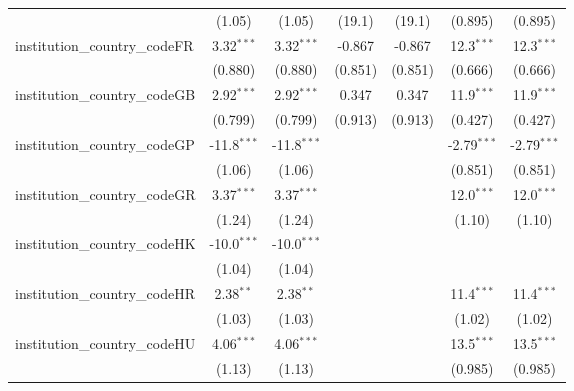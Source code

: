 \begin{tabular}{lcccccc}
                                         & (1.05)         & (1.05)         & (19.1)        & (19.1)        & (0.895)       & (0.895)\\   
   institution\_country\_codeFR          & 3.32$^{***}$   & 3.32$^{***}$   & -0.867        & -0.867        & 12.3$^{***}$  & 12.3$^{***}$\\   
                                         & (0.880)        & (0.880)        & (0.851)       & (0.851)       & (0.666)       & (0.666)\\   
   institution\_country\_codeGB          & 2.92$^{***}$   & 2.92$^{***}$   & 0.347         & 0.347         & 11.9$^{***}$  & 11.9$^{***}$\\   
                                         & (0.799)        & (0.799)        & (0.913)       & (0.913)       & (0.427)       & (0.427)\\   
   institution\_country\_codeGP          & -11.8$^{***}$  & -11.8$^{***}$  &               &               & -2.79$^{***}$ & -2.79$^{***}$\\   
                                         & (1.06)         & (1.06)         &               &               & (0.851)       & (0.851)\\   
   institution\_country\_codeGR          & 3.37$^{***}$   & 3.37$^{***}$   &               &               & 12.0$^{***}$  & 12.0$^{***}$\\   
                                         & (1.24)         & (1.24)         &               &               & (1.10)        & (1.10)\\   
   institution\_country\_codeHK          & -10.0$^{***}$  & -10.0$^{***}$  &               &               &               &   \\   
                                         & (1.04)         & (1.04)         &               &               &               &   \\   
   institution\_country\_codeHR          & 2.38$^{**}$    & 2.38$^{**}$    &               &               & 11.4$^{***}$  & 11.4$^{***}$\\   
                                         & (1.03)         & (1.03)         &               &               & (1.02)        & (1.02)\\   
   institution\_country\_codeHU          & 4.06$^{***}$   & 4.06$^{***}$   &               &               & 13.5$^{***}$  & 13.5$^{***}$\\   
                                         & (1.13)         & (1.13)         &               &               & (0.985)       & (0.985)\\   

\end{tabular}
